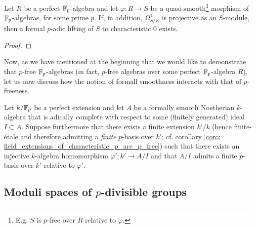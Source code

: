             \begin{proposition} \label{prop: existence_of_lifts_of_quasi_smooth_rings_of_characteristic_p}
                Let $R$ be a perfect $\mathbb{F}_p$-algebra and let $\varphi: R \to S$ be a quasi-smooth\footnote{E.g. $S$ is $p$-free over $R$ relative to $\varphi$.} morphism of $\mathbb{F}_p$-algebras, for some prime $p$. If, in addition, $\Omega^1_{S/R}$ is projective as an $S$-module, then a formal $p$-adic lifting of $S$ to characteristic $0$ exists. 
            \end{proposition}
                \begin{proof}
                    
                \end{proof}
            
            Now, as we have mentioned at the beginning that we would like to demonstrate that $p$-free $\mathbb{F}_p$-algebras (in fact, $p$-free algebras over some perfect $\mathbb{F}_p$-algebra $R$), let us now discuss how the notion of formall smoothness interacts with that of $p$-freeness.
            \begin{convention}
                Let $k/\mathbb{F}_p$ be a perfect extension and let $A$ be a formally smooth Noetherian $k$-algebra that is adically complete with respect to some (finitely generated) ideal $I \subset A$. Suppose furthermore that there exists a finite extension $k'/k$ (hence finite-\'etale and therefore admitting a \textit{finite} $p$-basis over $k'$; cf. corollary \ref{coro: field_extensions_of_characteristic_p_are_p_free}) such that there exists an injective $k$-algebra homomorphism $\varphi': k' \to A/I$ and that $A/I$ admits a finite $p$-basis over $k'$ relative to $\varphi'$.
            \end{convention}
    
    \subsection{Moduli spaces of \texorpdfstring{$p$}{}-divisible groups}